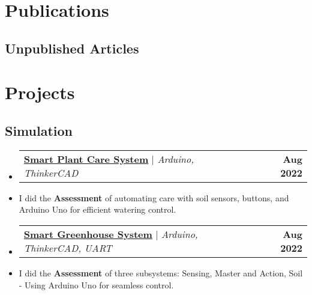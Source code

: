 \documentclass[letterpaper,11pt]{article}
\makeatletter
\newcommand{\resumeItem}[1]{
  \item\small{
    {#1 \vspace{-2pt}}
  }
}
\newcommand{\resumeProjectHeading}[2]{
    \item
    \begin{tabular*}{1.001\textwidth}{l@{\extracolsep{\fill}}r}
      \small#1 & \textbf{\small #2}\\
    \end{tabular*}\vspace{-7pt}
}
\newcommand{\resumeSubHeadingListStart}{\begin{itemize}[leftmargin=0.0in, label={}]}
\newcommand{\resumeSubHeadingListEnd}{\end{itemize}}
\makeatother
\begin{document}
\section{Publications}
    \nocite{*}
        \resumeSubHeadingListStart
         
       \vspace{-3pt} \subsection{Unpublished Articles} \vspace{-10pt}
        \printbibliography[heading={none},type=unpublished]
        \resumeSubHeadingListEnd

\vspace{-25pt}
\section{Projects}
         \subsection{Simulation} \vspace{-20pt}
    \resumeSubHeadingListStart
      \resumeProjectHeading
          {\textbf{\href{https://www.tinkercad.com/things/gVrKAFyUruq-smartplantcaresystemwithautowateringrefilling}{Smart Plant Care System}} $|$ \emph{Arduino, ThinkerCAD}}{Aug 2022} 
           \resumeItem{I did the \textbf{Assessment} of automating care with soil sensors, buttons, and Arduino Uno for efficient watering control.} \vspace{-15pt}
          \resumeProjectHeading 
          {\textbf{\href{https://www.tinkercad.com/things/esnvsztXcxI-smartgreenhousemonitoringandcontrolsystem}{Smart Greenhouse System}} $|$ \emph{Arduino, ThinkerCAD, UART}}{Aug 2022}
          \resumeItem{I did the \textbf{Assessment} of three subsystems: Sensing, Master and Action, Soil - Using Arduino Uno for seamless control.} 
    \resumeSubHeadingListEnd \vspace{-15pt}
\end{document}
